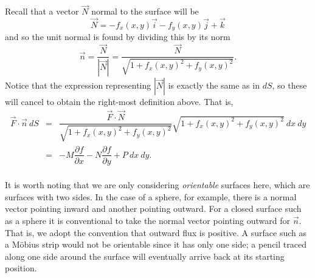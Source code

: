 
Recall that a vector $\vec N$ normal to the surface will be
$$\vec N = -f_x(x,y) \vec i - f_y(x,y) \vec j + \vec k$$
and so the unit normal is found by dividing this by its norm
$$\vec n = \dfrac{\vec N}{|\vec N|} = \dfrac{\vec N}{\sqrt{1 + f_x(x,y)^2 + f_y(x,y)^2}}.$$
Notice that the expression representing $| \vec N |$ is exactly the same as in $dS$, so these will cancel to obtain the right-most definition above. That is,
\begin{eqnarray*}
\vec F \cdot \vec n \: dS & = & \dfrac{\vec F \cdot \vec N}{\sqrt{1 + f_x(x,y)^2 + f_y(x,y)^2}} \sqrt{1 + f_x(x,y)^2 + f_y(x,y)^2} \: dx \: dy \\
& = & -M \dfrac{\partial f}{\partial x} - N\dfrac{\partial f}{\partial y} + P \: dx \: dy.
\end{eqnarray*}\\

It is worth noting that we are only considering \emph{orientable} surfaces here, which are surfaces with two sides. In the case of a sphere, for example, there is a normal vector pointing inward and another pointing outward. For a closed surface such as a sphere it is conventional to take the normal vector pointing outward for $\vec n$. That is, we adopt the convention that outward flux is positive. A surface such as a M\"obius strip would not be orientable since it has only one side; a pencil traced along one side around the surface will eventually arrive back at its starting position.\\

\\

